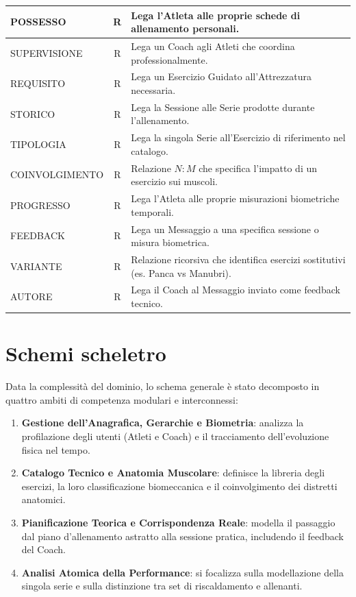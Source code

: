 \documentclass[12pt]{report}
\begin{document}
\begin{longtable}{|l|c|>{\raggedright\arraybackslash}p{8.5cm}|}
POSSESSO & R & Lega l'Atleta alle proprie schede di allenamento personali. \\ \hline
SUPERVISIONE & R & Lega un Coach agli Atleti che coordina professionalmente. \\ \hline
REQUISITO & R & Lega un Esercizio Guidato all'Attrezzatura necessaria. \\ \hline
STORICO & R & Lega la Sessione alle Serie prodotte durante l'allenamento. \\ \hline
TIPOLOGIA & R & Lega la singola Serie all'Esercizio di riferimento nel catalogo. \\ \hline
COINVOLGIMENTO & R & Relazione $N:M$ che specifica l'impatto di un esercizio sui muscoli. \\ \hline
PROGRESSO & R & Lega l'Atleta alle proprie misurazioni biometriche temporali. \\ \hline
FEEDBACK & R & Lega un Messaggio a una specifica sessione o misura biometrica. \\ \hline
VARIANTE & R & Relazione ricorsiva che identifica esercizi sostitutivi (es. Panca vs Manubri). \\ \hline
AUTORE & R & Lega il Coach al Messaggio inviato come feedback tecnico. \\ \hline

\end{longtable}
\normalsize 

\section{Schemi scheletro}
Data la complessità del dominio, lo schema generale è stato decomposto in quattro ambiti di competenza modulari e interconnessi:

\begin{enumerate}
    \item \textbf{Gestione dell'Anagrafica, Gerarchie e Biometria}: analizza la profilazione degli utenti (Atleti e Coach) e il tracciamento dell'evoluzione fisica nel tempo.
    \item \textbf{Catalogo Tecnico e Anatomia Muscolare}: definisce la libreria degli esercizi, la loro classificazione biomeccanica e il coinvolgimento dei distretti anatomici.
    \item \textbf{Pianificazione Teorica e Corrispondenza Reale}: modella il passaggio dal piano d'allenamento astratto alla sessione pratica, includendo il feedback del Coach.
    \item \textbf{Analisi Atomica della Performance}: si focalizza sulla modellazione della singola serie e sulla distinzione tra set di riscaldamento e allenanti.
\end{enumerate}
\end{document}

